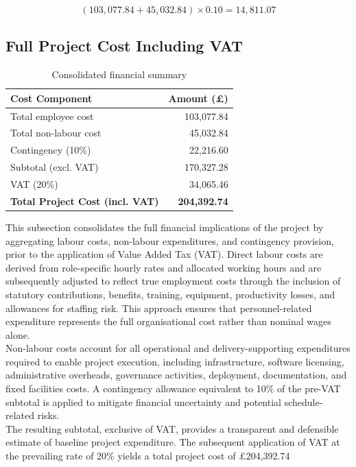 \documentclass{article}
\begin{document}
\[
(103,077.84 + 45,032.84) \times 0.10 = 14,811.07
\]

\subsection{Full Project Cost Including VAT}

\begin{table}[H]
\centering
\begin{tabular}{|l|r|}
\hline
\textbf{Cost Component} & \textbf{Amount (£)} \\
\hline
Total employee cost & 103,077.84 \\
Total non-labour cost & 45,032.84 \\
Contingency (10\%) & 22,216.60 \\
\hline
Subtotal (excl. VAT) & 170,327.28 \\
VAT (20\%) & 34,065.46
 \\
\hline
\textbf{Total Project Cost (incl. VAT)} & \textbf{204,392.74} \\
\hline
\end{tabular}
\caption{Consolidated financial summary}
\end{table}

\noindent
This subsection consolidates the full financial implications of the project by aggregating labour costs, non-labour expenditures, and contingency provision, prior to the application of Value Added Tax (VAT). Direct labour costs are derived from role-specific hourly rates and allocated working hours and are subsequently adjusted to reflect true employment costs through the inclusion of statutory contributions, benefits, training, equipment, productivity losses, and allowances for staffing risk. This approach ensures that personnel-related expenditure represents the full organisational cost rather than nominal wages alone. \\

Non-labour costs account for all operational and delivery-supporting expenditures required to enable project execution, including infrastructure, software licensing, administrative overheads, governance activities, deployment, documentation, and fixed facilities costs. A contingency allowance equivalent to 10\% of the pre-VAT subtotal is applied to mitigate financial uncertainty and potential schedule-related risks. \\

The resulting subtotal, exclusive of VAT, provides a transparent and defensible estimate of baseline project expenditure. The subsequent application of VAT at the prevailing rate of 20\% yields a total project cost of \pounds204{,}392.74 \\
\end{document}
